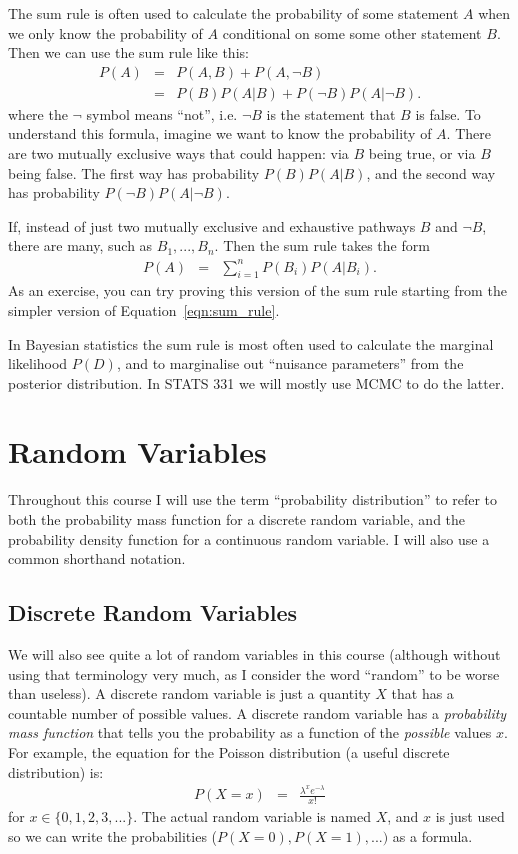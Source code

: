 The sum rule is often used to calculate the
probability of some statement
$A$ when we only know the probability of $A$ conditional on some
some other statement $B$. Then we
can use the sum rule like this:
\begin{eqnarray}
P(A) &=& P(A, B) + P(A, \neg B)\\
&=& P(B)P(A|B) + P(\neg B)P(A|\neg B).
\end{eqnarray}
where the $\neg$ symbol means ``not'', i.e. $\neg B$ is the statement that
$B$ is false. To understand
this formula, imagine we want to know the probability of $A$. There are
two mutually exclusive ways that could happen: via $B$ being true, or via $B$
being false. The first way has probability $P(B)P(A|B)$, and the second way
has probability $P(\neg B)P(A|\neg B)$.

If, instead of just two mutually exclusive and exhaustive
pathways $B$ and $\neg B$, there are many, such as $B_1, ..., B_n$.
Then the sum rule takes the form
\begin{eqnarray}
P(A) &=& \sum_{i=1}^n P(B_i)P(A|B_i).
\end{eqnarray}
As an exercise, you can try proving this version of the sum rule
starting from the simpler version of Equation~\ref{eqn:sum_rule}.

In Bayesian statistics the sum rule is most often used to calculate the
marginal likelihood $P(D)$, and to marginalise out ``nuisance
parameters'' from the posterior distribution. In STATS 331 we will mostly use
MCMC to do the latter.

\section{Random Variables}
Throughout this course I will use the term ``probability distribution'' to
refer to both the probability mass function for a discrete random variable, and
the probability density function for a continuous random variable. I will also
use a common shorthand notation.

\subsection{Discrete Random Variables}
We will also see quite a lot of random variables in this course (although
without using that terminology very much, as I consider the word ``random'' to be
worse than useless). A discrete
random variable is just a quantity $X$ that has a countable number of possible
values. A discrete random variable has a {\it probability mass function}
that tells you the probability as a function of the {\it possible} values $x$.
For example, the equation for the Poisson distribution (a useful discrete
distribution) is:
\begin{eqnarray}
P(X=x) &=& \frac{\lambda^x e^{-\lambda}}{x!}\label{eq:poisson}
\end{eqnarray}
for $x \in \{0, 1, 2, 3, ...\}$. The actual random variable is named $X$, and
$x$ is just used so we can write the probabilities ($P(X=0), P(X=1), ...)$ as
a formula.


